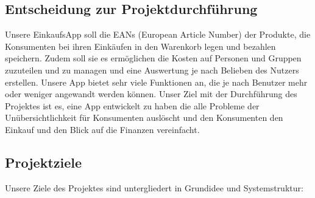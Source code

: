 \documentclass[12pt,a4paper]{article}
\begin{document}
\subsection{Entscheidung zur Projektdurchführung}
Unsere EinkaufsApp soll die EANs (European Article Number) der Produkte, die Konsumenten bei ihren Einkäufen in den Warenkorb legen und bezahlen  speichern.
Zudem soll sie es ermöglichen die Kosten auf Personen und Gruppen zuzuteilen und zu managen und eine Auswertung je nach Belieben des Nutzers erstellen.
Unsere App bietet sehr viele Funktionen an, die je nach Benutzer mehr oder weniger angewandt werden können.
Unser Ziel mit der Durchführung des Projektes ist es, eine App entwickelt zu haben die alle Probleme der Unübersichtlichkeit für Konsumenten auslöscht und den Konsumenten den Einkauf und den Blick auf die Finanzen vereinfacht.

\newpage

\subsection{Projektziele}
Unsere Ziele des Projektes sind untergliedert in Grundidee und Systemstruktur:
\end{document}
